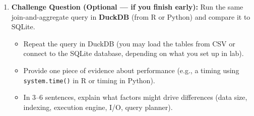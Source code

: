 \documentclass[11pt]{article}
\begin{document}
\begin{enumerate}
\item \textbf{Challenge Question (Optional --- if you finish early):}
Run the same join-and-aggregate query in \textbf{DuckDB} (from R or Python) and compare it to SQLite.
\begin{itemize}
  \item Repeat the query in DuckDB (you may load the tables from CSV or connect to the SQLite database, depending on what you set up in lab).
  \item Provide one piece of evidence about performance (e.g., a timing using \texttt{system.time()} in R or timing in Python).
  \item In 3--6 sentences, explain what factors might drive differences (data size, indexing, execution engine, I/O, query planner).
\end{itemize}

\end{enumerate}
\end{document}
